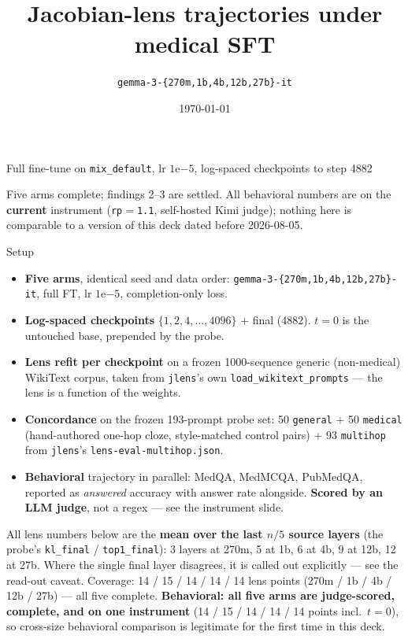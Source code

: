 \documentclass[aspectratio=169,10pt]{beamer}
\title{Jacobian-lens trajectories under medical SFT}
\subtitle{\texttt{gemma-3-\{270m,1b,4b,12b,27b\}-it}}
\author{}
\date{\today}
\newcommand{\good}[1]{\textcolor{up}{#1}}
\begin{document}
\begin{frame}
  \titlepage
  \vspace{-2em}
  \centering\small
  Full fine-tune on \texttt{mix\_default}, lr $1\mathrm{e}{-5}$, log-spaced
  checkpoints to step 4882

  \vspace{0.8em}
  {\footnotesize\good{Five arms complete; findings 2--3 are settled.}
  All behavioral numbers are on the \textbf{current} instrument
  (\texttt{rp}$=$\texttt{1.1}, self-hosted Kimi judge); nothing here is
  comparable to a version of this deck dated before 2026-08-05.}
\end{frame}

\begin{frame}{Setup}
  \begin{itemize}
    \item \textbf{Five arms}, identical seed and data order:
      \texttt{gemma-3-\{270m,1b,4b,12b,27b\}-it}, full FT,
      lr $1\mathrm{e}{-5}$, completion-only loss.
    \item \textbf{Log-spaced checkpoints} $\{1,2,4,\dots,4096\}$ + final (4882).
      $t=0$ is the untouched base, prepended by the probe.
    \item \textbf{Lens refit per checkpoint} on a frozen 1000-sequence generic
      (non-medical) WikiText corpus, taken from \texttt{jlens}'s own
      \texttt{load\_wikitext\_prompts} --- the lens is a function of the weights.
    \item \textbf{Concordance} on the frozen 193-prompt probe set:
      50 \texttt{general} + 50 \texttt{medical} (hand-authored one-hop cloze,
      style-matched control pairs) + 93 \texttt{multihop} from
      \texttt{jlens}'s \texttt{lens-eval-multihop.json}.
    \item \textbf{Behavioral} trajectory in parallel: MedQA, MedMCQA, PubMedQA,
      reported as \emph{answered} accuracy with answer rate alongside.
      \textbf{Scored by an LLM judge}, not a regex --- see the instrument slide.
  \end{itemize}
  \vfill
  {\footnotesize All lens numbers below are the \textbf{mean over the last
  $n/5$ source layers} (the probe's \texttt{kl\_final} / \texttt{top1\_final}):
  3 layers at 270m, 5 at 1b, 6 at 4b, 9 at 12b, 12 at 27b. Where the single
  final layer disagrees, it is called out explicitly --- see the read-out
  caveat. Coverage: 14 / 15 / 14 / 14 / 14 lens points
  (270m / 1b / 4b / 12b / 27b) --- all five complete.
  \textbf{Behavioral: all five arms are judge-scored, complete, and on
  one instrument} (14 / 15 / 14 / 14 / 14 points incl.\ $t{=}0$), so cross-size
  behavioral comparison is legitimate for the first time in this deck.}
\end{frame}
\end{document}
